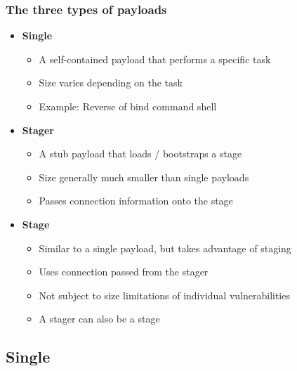 \documentclass{beamer}
\newenvironment{sitemize}{\vspace{1mm}\begin{itemize}\itemsep 4pt\small}{\end{itemize}}
\begin{document}
\begin{frame}[t]
    \frametitle{The three types of payloads}

    \begin{sitemize}
        \item \textbf{Single}
        \begin{sitemize}
            \item A self-contained payload that performs a specific
            task
            \item Size varies depending on the task
        \item Example: Reverse of bind command shell
        \end{sitemize}

        \pause
        \item \textbf{Stager}
        \begin{sitemize}
            \item A stub payload that loads / bootstraps a stage
            \item Size generally much smaller than single payloads
            \item Passes connection information onto the stage
        \end{sitemize}

        \pause
        \item \textbf{Stage}
        \begin{sitemize}
            \item Similar to a single payload, but takes advantage
            of staging
            \item Uses connection passed from the stager
            \item Not subject to size limitations of individual
            vulnerabilities
        \item A stager can also be a stage
        \end{sitemize}
    \end{sitemize}
\end{frame}

\subsection{Single}
\end{document}

